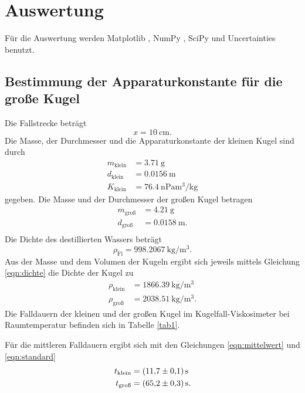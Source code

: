 \section{Auswertung}
\label{sec:Auswertung}
Für die Auswertung werden Matplotlib \cite{matplotlib}, NumPy \cite{numpy}, SciPy \cite{scipy} 
und Uncertainties \cite{uncertainties} benutzt.

\subsection{Bestimmung der Apparaturkonstante für die große Kugel}
Die Fallstrecke beträgt 
\begin{equation*}
    x = \SI{10}{\centi\meter}.
\end{equation*}
Die Masse, der Durchmesser und die Apparaturkonstante der kleinen Kugel sind durch
\begin{align*}
    m_\text{klein} &= \SI{3.71}{\gram} \\
    d_\text{klein} &= \SI{0.0156}{\meter} \\
    K_\text{klein} &= \SI{76.4}{\nano\pascal\cubic\meter\per\kilo\gram}
\end{align*}
gegeben.
Die Masse und der Durchmesser der großen Kugel  betragen
\begin{align*}
    m_\text{groß} &= \SI{4.21}{\gram} \\
    d_\text{groß} &= \SI{0.0158}{\meter}. \\
\end{align*}
Die Dichte des destillierten Wassers beträgt
\begin{equation*}
    \rho_\text{Fl} = \SI{998.2067}{\kilo\gram\per\cubic\meter}.
\end{equation*}
Aus der Masse und dem Volumen der Kugeln ergibt sich jeweils mittels Gleichung \eqref{eqn:dichte}
die Dichte der Kugel zu
\begin{align*}
    \rho_\text{klein} &= \SI{1866.39}{\kilo\gram\per\cubic\meter} \\
    \rho_\text{groß} &= \SI{2038.51}{\kilo\gram\per\cubic\meter}.
\end{align*}
Die Falldauern der kleinen und der großen Kugel im Kugelfall-Viskosimeter
bei Raumtemperatur befinden sich in Tabelle \ref{tab1}.

\noindent Für die mittleren Falldauern ergibt sich mit den Gleichungen \eqref{eqn:mittelwert} 
und \eqref{eqn:standard}
\begin{align*}
    t_\text{klein} &= \SI{11.7 \pm 0.1}{\second} \\
    t_\text{groß} &= \SI{65.2 \pm 0.3}{\second}.
\end{align*}
